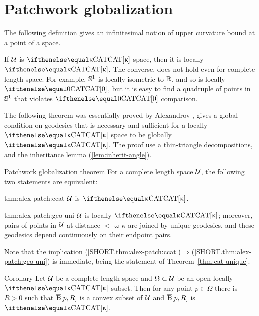 
\section{Patchwork globalization}\label{sec:patchwork}

The following definition gives an infinitesimal 
 notion of upper curvature bound at a point of a space.
 


If $\mathcal{U}$ is $\CAT\kappa$ space, then it is locally $\CAT\kappa$.
The converse, does not hold even for complete length space.
For example, $\mathbb{S}^1$ is locally isometric to $\mathbb{R}$, and so
is locally $\CAT0$, but it is easy to find a quadruple of points in $\mathbb{S}^1$ that violates $\CAT0$ comparison.  

The following theorem was essentially proved by Alexandrov \cite[Satz 9]{alexandrov:devel}, 
gives a global condition on geodesics that is  necessary and sufficient for a locally $\CAT\kappa$ space to be globally $\CAT\kappa$. 
The proof use a thin-triangle decompositions, 
and the inheritance lemma (\ref{lem:inherit-angle}). 

\begin{thm}{Patchwork globalization theorem}\label{thm:alex-patch}
For a complete length space $\mathcal{U}$, the following two statements are equivalent:

\begin{subthm}{thm:alex-patch:ccat}
$\mathcal{U}$ is $\CAT\kappa$.
\end{subthm}
 
\begin{subthm}{thm:alex-patch:geo-uni}
$\mathcal{U}$ is locally $\CAT\kappa$; moreover,  pairs of points in $\mathcal{U}$ at distance $<\varpi\kappa$ are joined by unique geodesics, and these geodesics depend continuously on their endpoint pairs.
\end{subthm}

\end{thm}

Note that the implication (\ref{SHORT.thm:alex-patch:ccat})$\Rightarrow$(\ref{SHORT.thm:alex-patch:geo-uni})
is immediate, being the statement of Theorem~\ref{thm:cat-unique}.

\begin{thm}{Corollary}\label{cor:k-for-k}
Let $\mathcal{U}$ be a complete length  space 
and $\Omega\subset\spc{U}$ be an open locally $\CAT\kappa$ subset. 
Then for any point $p\in \Omega$ there is $R>0$ such that $\overline{\mathrm{B}}{}[p,R]$ is a convex subset of $\mathcal{U}$ 
and $\overline{\mathrm{B}}{}[p,R]$ is $\CAT\kappa$.
\end{thm}

